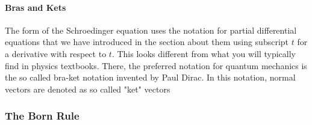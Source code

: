 

% 



\paragraph{Bras and Kets}
The form of the Schroedinger equation uses the notation for partial differential equations that we have introduced in the section about them using subscript $t$ for a derivative with respect to $t$. This looks different from what you will typically find in physics textbooks. There, the preferred notation for quantum mechanics is the so called bra-ket notation invented by Paul Dirac. In this notation, normal vectors are denoted as so called "ket" vectors



\subsubsection{The Born Rule}










